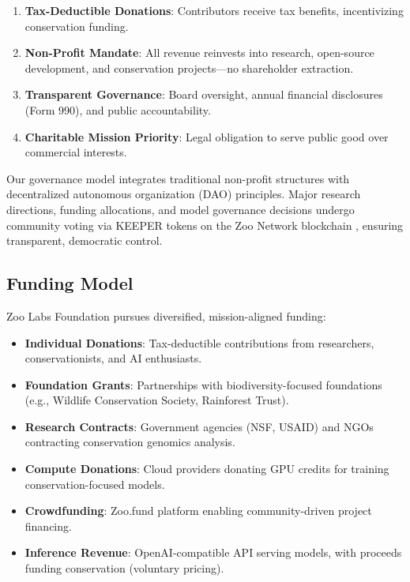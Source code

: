 \documentclass[twocolumn,11pt]{article}
\begin{document}
\begin{enumerate}
    \item \textbf{Tax-Deductible Donations}: Contributors receive tax benefits, incentivizing conservation funding.
    \item \textbf{Non-Profit Mandate}: All revenue reinvests into research, open-source development, and conservation projects—no shareholder extraction.
    \item \textbf{Transparent Governance}: Board oversight, annual financial disclosures (Form 990), and public accountability.
    \item \textbf{Charitable Mission Priority}: Legal obligation to serve public good over commercial interests.
\end{enumerate}

Our governance model integrates traditional non-profit structures with decentralized autonomous organization (DAO) principles. Major research directions, funding allocations, and model governance decisions undergo community voting via KEEPER tokens on the Zoo Network blockchain \citep{zoo2024whitepaper}, ensuring transparent, democratic control.

\subsection{Funding Model}

Zoo Labs Foundation pursues diversified, mission-aligned funding:

\begin{itemize}
    \item \textbf{Individual Donations}: Tax-deductible contributions from researchers, conservationists, and AI enthusiasts.
    \item \textbf{Foundation Grants}: Partnerships with biodiversity-focused foundations (e.g., Wildlife Conservation Society, Rainforest Trust).
    \item \textbf{Research Contracts}: Government agencies (NSF, USAID) and NGOs contracting conservation genomics analysis.
    \item \textbf{Compute Donations}: Cloud providers donating GPU credits for training conservation-focused models.
    \item \textbf{Crowdfunding}: Zoo.fund platform enabling community-driven project financing.
    \item \textbf{Inference Revenue}: OpenAI-compatible API serving models, with proceeds funding conservation (voluntary pricing).
\end{itemize}
\end{document}
